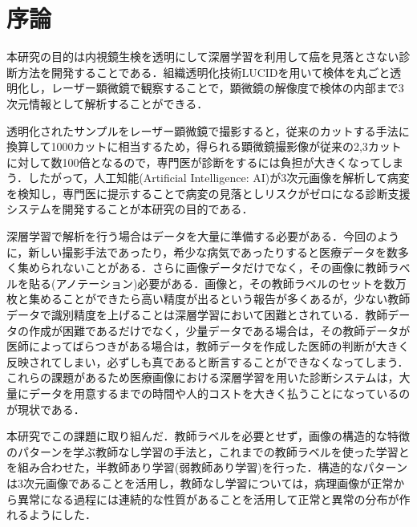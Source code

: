 \chapter{序論}
\label{chap_intro}

本研究の目的は内視鏡生検を透明にして深層学習を利用して癌を見落とさない診断方法を開発することである．組織透明化技術LUCIDを用いて検体を丸ごと透明化し，レーザー顕微鏡で観察することで，顕微鏡の解像度で検体の内部まで3次元情報として解析することができる．

透明化されたサンプルをレーザー顕微鏡で撮影すると，従来のカットする手法に換算して1000カットに相当するため，得られる顕微鏡撮影像が従来の2,3カットに対して数100倍となるので，専門医が診断をするには負担が大きくなってしまう．したがって，人工知能(Artificial Intelligence: AI)が3次元画像を解析して病変を検知し，専門医に提示することで病変の見落としリスクがゼロになる診断支援システムを開発することが本研究の目的である．

深層学習で解析を行う場合はデータを大量に準備する必要がある．今回のように，新しい撮影手法であったり，希少な病気であったりすると医療データを数多く集められないことがある．さらに画像データだけでなく，その画像に教師ラベルを貼る(アノテーション)必要がある．画像と，その教師ラベルのセットを数万枚と集めることができたら高い精度が出るという報告が多くあるが，少ない教師データで識別精度を上げることは深層学習において困難とされている．教師データの作成が困難であるだけでなく，少量データである場合は，その教師データが医師によってばらつきがある場合は，教師データを作成した医師の判断が大きく反映されてしまい，必ずしも真であると断言することができなくなってしまう．これらの課題があるため医療画像における深層学習を用いた診断システムは，大量にデータを用意するまでの時間や人的コストを大きく払うことになっているのが現状である．

本研究でこの課題に取り組んだ．教師ラベルを必要とせず，画像の構造的な特徴のパターンを学ぶ教師なし学習の手法と，これまでの教師ラベルを使った学習とを組み合わせた，半教師あり学習(弱教師あり学習)を行った．構造的なパターンは3次元画像であることを活用し，教師なし学習については，病理画像が正常から異常になる過程には連続的な性質があることを活用して正常と異常の分布が作れるようにした．
